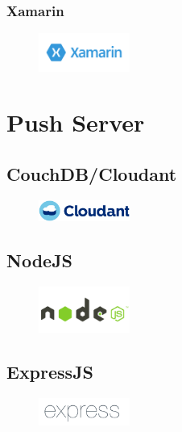 \subsubsection{Xamarin}
\begin{figure}
\includegraphics[width=3cm]{img/mobile-app/logos/xamarin.png}
\end{figure} 

  \section{Push Server}

\subsection{CouchDB/Cloudant}
\begin{figure}
\includegraphics[width=3cm]{img/mobile-app/logos/cloudant.jpg}
\end{figure} 

\subsection{NodeJS}
\begin{figure}
\includegraphics[width=3cm]{img/mobile-app/logos/nodejs.png}
\end{figure} 

\subsection{ExpressJS}
\begin{figure}
\includegraphics[width=3cm]{img/mobile-app/logos/express.png}
\end{figure} 

